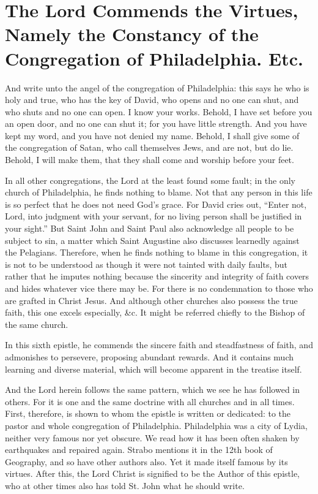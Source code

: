 \chapter[Sermon 17. The Lord Commends the Virtues, Namely the Constancy of the Congregation of Philadelphia. Etc.]{The Lord Commends the Virtues, Namely the Constancy of the Congregation of Philadelphia. Etc.}
\label{sermon:017}

And write unto the angel of the congregation of Philadelphia: this says he who is holy and true, who has the key of David, who opens and no one can shut, and who shuts and no one can open. I know your works. Behold, I have set before you an open door, and no one can shut it; for you have little strength. And you have kept my word, and you have not denied my name. Behold, I shall give some of the congregation of Satan, who call themselves Jews, and are not, but do lie. Behold, I will make them, that they shall come and worship before your feet.

In all other congregations, the Lord at the least found some fault; in the only church of Philadelphia, he finds nothing to blame. Not that any person in this life is so perfect that he does not need God’s grace. For David cries out, “Enter not, Lord, into judgment with your servant, for no living person shall be justified in your sight.” But Saint John and Saint Paul also acknowledge all people to be subject to sin, a matter which Saint Augustine also discusses learnedly against the Pelagians. Therefore, when he finds nothing to blame in this congregation, it is not to be understood as though it were not tainted with daily faults, but rather that he imputes nothing because the sincerity and integrity of faith covers and hides whatever vice there may be. For there is no condemnation to those who are grafted in Christ Jesus. And although other churches also possess the true faith, this one excels especially, \&c. It might be referred chiefly to the Bishop of the same church.

In this sixth epistle, he commends the sincere faith and steadfastness of faith, and admonishes to persevere, proposing abundant rewards. And it contains much learning and diverse material, which will become apparent in the treatise itself.

And the Lord herein follows the same pattern, which we see he has followed in others. For it is one and the same doctrine with all churches and in all times. First, therefore, is shown to whom the epistle is written or dedicated: to the pastor and whole congregation of Philadelphia. Philadelphia was a city of Lydia, neither very famous nor yet obscure. We read how it has been often shaken by earthquakes and repaired again. Strabo mentions it in the 12th book of Geography, and so have other authors also. Yet it made itself famous by its virtues. After this, the Lord Christ is signified to be the Author of this epistle, who at other times also has told St. John what he should write.

